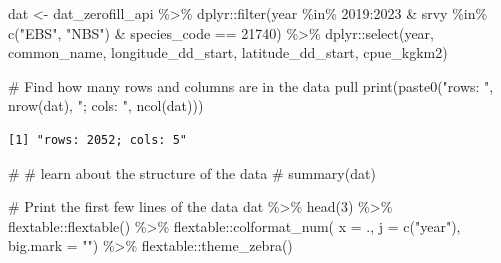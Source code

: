 \documentclass[
  letterpaper,
  oneside,
  open=any]{scrbook}
\newenvironment{Shaded}{\begin{snugshade}}{\end{snugshade}}
\newcommand{\AttributeTok}[1]{\textcolor[rgb]{0.40,0.45,0.13}{#1}}
\newcommand{\CommentTok}[1]{\textcolor[rgb]{0.37,0.37,0.37}{#1}}
\newcommand{\DecValTok}[1]{\textcolor[rgb]{0.68,0.00,0.00}{#1}}
\newcommand{\FunctionTok}[1]{\textcolor[rgb]{0.28,0.35,0.67}{#1}}
\newcommand{\NormalTok}[1]{\textcolor[rgb]{0.00,0.23,0.31}{#1}}
\newcommand{\OtherTok}[1]{\textcolor[rgb]{0.00,0.23,0.31}{#1}}
\newcommand{\SpecialCharTok}[1]{\textcolor[rgb]{0.37,0.37,0.37}{#1}}
\newcommand{\StringTok}[1]{\textcolor[rgb]{0.13,0.47,0.30}{#1}}
\begin{document}
\begin{Shaded}
\begin{Highlighting}[]
\NormalTok{dat }\OtherTok{\textless{}{-}}\NormalTok{ dat\_zerofill\_api }\SpecialCharTok{\%\textgreater{}\%} 
\NormalTok{  dplyr}\SpecialCharTok{::}\FunctionTok{filter}\NormalTok{(year }\SpecialCharTok{\%in\%} \DecValTok{2019}\SpecialCharTok{:}\DecValTok{2023} \SpecialCharTok{\&} 
\NormalTok{                  srvy }\SpecialCharTok{\%in\%} \FunctionTok{c}\NormalTok{(}\StringTok{"EBS"}\NormalTok{, }\StringTok{"NBS"}\NormalTok{) }\SpecialCharTok{\&} 
\NormalTok{                  species\_code }\SpecialCharTok{==} \DecValTok{21740}\NormalTok{) }\SpecialCharTok{\%\textgreater{}\%} 
\NormalTok{  dplyr}\SpecialCharTok{::}\FunctionTok{select}\NormalTok{(year, common\_name, longitude\_dd\_start, latitude\_dd\_start, cpue\_kgkm2)}

\CommentTok{\# Find how many rows and columns are in the data pull}
\FunctionTok{print}\NormalTok{(}\FunctionTok{paste0}\NormalTok{(}\StringTok{"rows: "}\NormalTok{, }\FunctionTok{nrow}\NormalTok{(dat), }\StringTok{"; cols: "}\NormalTok{, }\FunctionTok{ncol}\NormalTok{(dat)))}
\end{Highlighting}
\end{Shaded}

\begin{verbatim}
[1] "rows: 2052; cols: 5"
\end{verbatim}

\begin{Shaded}
\begin{Highlighting}[]
\CommentTok{\# \# learn about the structure of the data}
\CommentTok{\# summary(dat)}

\CommentTok{\# Print the first few lines of the data }
\NormalTok{dat }\SpecialCharTok{\%\textgreater{}\%} 
  \FunctionTok{head}\NormalTok{(}\DecValTok{3}\NormalTok{) }\SpecialCharTok{\%\textgreater{}\%} 
\NormalTok{  flextable}\SpecialCharTok{::}\FunctionTok{flextable}\NormalTok{() }\SpecialCharTok{\%\textgreater{}\%}
\NormalTok{  flextable}\SpecialCharTok{::}\FunctionTok{colformat\_num}\NormalTok{(}
      \AttributeTok{x =}\NormalTok{ ., }
      \AttributeTok{j =} \FunctionTok{c}\NormalTok{(}\StringTok{"year"}\NormalTok{), }
      \AttributeTok{big.mark =} \StringTok{""}\NormalTok{) }\SpecialCharTok{\%\textgreater{}\%} 
\NormalTok{  flextable}\SpecialCharTok{::}\FunctionTok{theme\_zebra}\NormalTok{()}
\end{Highlighting}
\end{Shaded}
\end{document}
